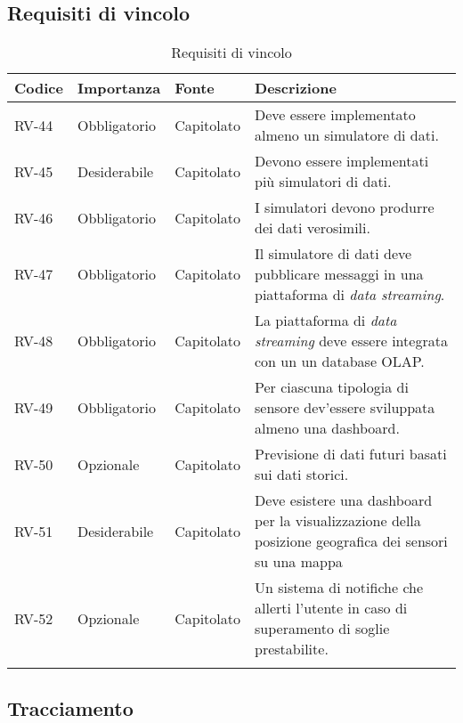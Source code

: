 \subsection{Requisiti di vincolo}
\begin{longtable}{|>{\centering\arraybackslash}m{}|>{\centering\arraybackslash}m{}|>{\centering\arraybackslash}m{}|>{\centering\arraybackslash}m{}|}
	\hline
	\textbf{Codice} & \textbf{Importanza} & \textbf{Fonte} & \textbf{Descrizione}
	\\\hline
	\endfirsthead
	\hline
	\endhead
	RV-44           & Obbligatorio        & Capitolato     & Deve essere implementato almeno un simulatore di dati.
	\\\hline
	RV-45           & Desiderabile        & Capitolato     & Devono essere implementati più simulatori di dati.
	\\\hline
	RV-46           & Obbligatorio        & Capitolato     & I simulatori devono produrre dei dati verosimili.                                                       \\\hline
	RV-47           & Obbligatorio        & Capitolato     & Il simulatore di dati deve pubblicare messaggi in una piattaforma di \textit{data streaming}.
	\\\hline
	RV-48           & Obbligatorio        & Capitolato     & La piattaforma di \textit{data streaming} deve essere integrata con un un database OLAP.
	\\\hline
	RV-49           & Obbligatorio        & Capitolato     & Per ciascuna tipologia di sensore dev'essere sviluppata almeno una dashboard.
	\\\hline
	RV-50           & Opzionale           & Capitolato     & Previsione di dati futuri basati sui dati storici.                                                      \\\hline
	RV-51           & Desiderabile        & Capitolato     & Deve esistere una dashboard per la visualizzazione della posizione geografica dei sensori su una mappa
	\\\hline
	RV-52           & Opzionale           & Capitolato     & Un sistema di notifiche che allerti l'utente in caso di superamento di soglie prestabilite.
	\\\hline
	\caption{Requisiti di vincolo}
\end{longtable}

\subsection{Tracciamento}

